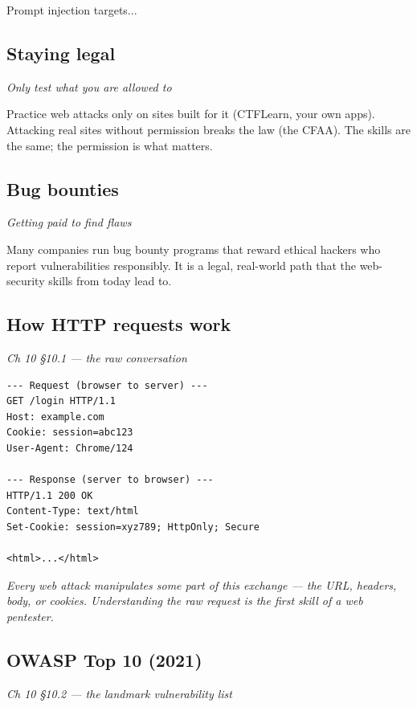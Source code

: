 \documentclass[12pt,openany]{book}
\begin{document}
Prompt injection targets...

\medskip

\subsection*{Staying legal}
{\small\itshape\color{gray}Only test what you are allowed to}


Practice web attacks only on sites built for it (CTFLearn, your own apps). Attacking real sites without permission breaks the law (the CFAA). The skills are the same; the permission is what matters.

\medskip

\subsection*{Bug bounties}
{\small\itshape\color{gray}Getting paid to find flaws}


Many companies run bug bounty programs that reward ethical hackers who report vulnerabilities responsibly. It is a legal, real-world path that the web-security skills from today lead to.

\medskip

\subsection*{How HTTP requests work}
{\small\itshape\color{gray}Ch 10 §10.1 --- the raw conversation}

\begin{lstlisting}
--- Request (browser to server) ---
GET /login HTTP/1.1
Host: example.com
Cookie: session=abc123
User-Agent: Chrome/124

--- Response (server to browser) ---
HTTP/1.1 200 OK
Content-Type: text/html
Set-Cookie: session=xyz789; HttpOnly; Secure

<html>...</html>\end{lstlisting}

{\small\itshape\color{gray}Every web attack manipulates some part of this exchange --- the URL, headers, body, or cookies. Understanding the raw request is the first skill of a web pentester.}

\medskip

\subsection*{OWASP Top 10 (2021)}
{\small\itshape\color{gray}Ch 10 §10.2 --- the landmark vulnerability list}
\end{document}
